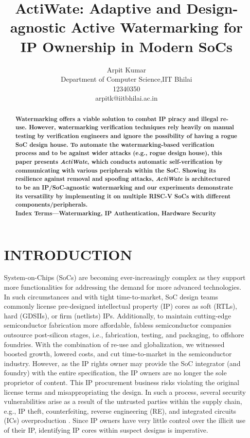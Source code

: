 \documentclass[onecolumn]{IEEEtran}
\title{\textbf{ActiWate: Adaptive and Design-agnostic Active Watermarking for IP Ownership in Modern SoCs}}
\author{{\large Arpit Kumar}\\ Department of Computer Science,IIT Bhilai\\ 12340350 \\ {{arpitk@iitbhilai.ac.in}}}
\date{}
\begin{document}
\maketitle
\begin{abstract}
\textbf{	Watermarking offers a viable solution to combat IP piracy
	and illegal re-use. However, watermarking verification techniques rely
	heavily on manual testing by verification engineers and ignore the
	possibility of having a rogue SoC design house. To automate the
	watermarking-based verification process and to be against wider attacks
	(e.g., rogue design house), this paper presents \textit{ActiWate}, which conducts
	automatic self-verification by communicating with various peripherals
	within the SoC. Showing its resilience against removal and spoofing
	attacks, \textit{ActiWate} is architectured to be an IP/SoC-agnostic watermarking
	and our experiments demonstrate its versatility by implementing it on
	multiple RISC-V SoCs with different components/peripherals.\\
	Index Terms—Watermarking, IP Authentication, Hardware Security}
\end{abstract}

\section{INTRODUCTION}
\label{sec1}
System-on-Chips (SoCs) are becoming ever-increasingly complex
as they support more functionalities for addressing the demand for
more advanced technologies. In such circumstances and with tight
time-to-market, SoC design teams commonly license pre-designed
intellectual property (IP) cores as soft (RTLs), hard (GDSIIs), or firm
(netlists) IPs. Additionally, to maintain cutting-edge semiconductor
fabrication more affordable, fabless semiconductor companies outsource post-silicon stages, i.e., fabrication, testing, and packaging, to
offshore foundries. With the combination of re-use and globalization,
we witnessed boosted growth, lowered costs, and cut time-to-market
in the semiconductor industry. However, as the IP rights owner may
provide the SoC integrator (and foundry) with the entire specification,
the IP owners are no longer the sole proprietor of content. This
IP procurement business risks violating the original license terms
and misappropriating the design. In such a process, several security
vulnerabilities arise as a result of the untrusted parties within the
supply chain, e.g., IP theft, counterfeiting, reverse engineering (RE),
and integrated circuits (ICs) overproduction \cite{a}. Since IP owners have
very little control over the illicit use of their IP, identifying IP cores
within suspect designs is imperative.
\end{document}
